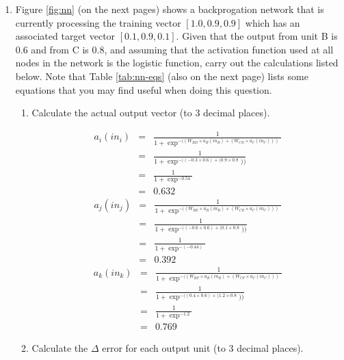 \documentclass[solution]{ditpaper}
\begin{document}
\begin{enumerate}
		\item Figure \ref{fig:nn} (on the next pages) shows a backprogation network that is currently processing the training vector $[1.0, 0.9, 0.9]$ which has an  associated target vector $[0.1, 0.9, 0.1]$. Given that the output from unit B is $0.6$ and from C is $0.8$, and assuming that the activation function used at all nodes in the network is the logistic function, carry out the calculations listed below. Note that Table \ref{tab:nn-eqs} (also on the next page) lists some equations that you may find useful when doing this question. 
\begin{enumerate}
	\item Calculate the actual output vector (to 3 decimal places).
		\begin{answer}
		\begin{eqnarray*}
		a_i(in_i) &=&\frac{1}{1 + \exp^{- ((W_{BD} \times a_B(in_B) + (W_{CD} \times a_C(in_C) ))}}\\
		&=&\frac{1}{1 + \exp^{- ((-0.3 \times 0.6) + (0.9 \times 0.8}))}\\
		&=&\frac{1}{1 + \exp^{- 0.54}}\\
		&=&0.632
		\end{eqnarray*}
		\begin{eqnarray*}
		a_j(in_j) &=&\frac{1}{1 + \exp^{- ((W_{BE} \times a_B(in_B) + (W_{CE} \times a_C(in_C) ))}}\\
		& = &\frac{1}{1 + \exp^{- ((-0.6 \times 0.6) + (0.1 \times 0.8}))}\\
		& = &\frac{1}{1 + \exp^{- (-0.44)}}\\
		& = &0.392
		\end{eqnarray*}
		\begin{eqnarray*}
		a_k(in_k) &=&\frac{1}{1 + \exp^{- ((W_{BF} \times a_B(in_B) + (W_{CF} \times a_C(in_C) ))}}\\
		& = &\frac{1}{1 + \exp^{- ((0.4 \times 0.6) + (1.2 \times 0.8}))}\\
		& = &\frac{1}{1 + \exp^{- 1.2}}\\
		& = &0.769
		\end{eqnarray*}
		\end{answer}
	\item Calculate the \textbf{$\Delta$} error for each output unit (to 3 decimal places).

\end{enumerate}
\end{enumerate}
\end{document}
